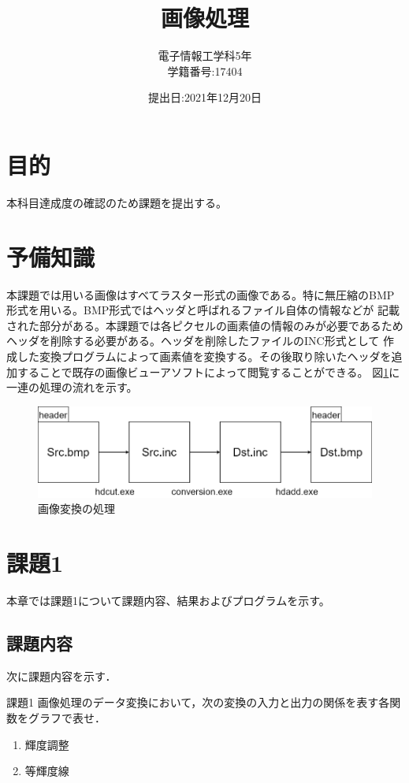 \documentclass[11pt,a4paper,titlepage,dvipdfmx]{jarticle}
\title{\huge{画像処理}}
\author{電子情報工学科5年 \\学籍番号:17404}
\date{提出日:2021年12月20日}
\begin{document}
  \maketitle

  \section{目的}
    本科目達成度の確認のため課題を提出する。
  \section{予備知識}
    本課題では用いる画像はすべてラスター形式の画像である。特に無圧縮のBMP形式を用いる。BMP形式ではヘッダと呼ばれるファイル自体の情報などが
    記載された部分がある。本課題では各ピクセルの画素値の情報のみが必要であるためヘッダを削除する必要がある。ヘッダを削除したファイルのINC形式として
    作成した変換プログラムによって画素値を変換する。その後取り除いたヘッダを追加することで既存の画像ビューアソフトによって閲覧することができる。
    図\ref{fig:flow}に一連の処理の流れを示す。
    \begin{figure}[H]
      \centering
      \includegraphics[scale=.4]{./flow.png}
      \caption{画像変換の処理}
      \label{fig:flow}
    \end{figure}
  \section{課題1}
    本章では課題1について課題内容、結果およびプログラムを示す。
    \subsection{課題内容}
      次に課題内容を示す．
      \begin{itembox}[l]{課題1}
        画像処理のデータ変換において，次の変換の入力と出力の関係を表す各関数をグラフで表せ．
        \begin{enumerate}
          \item 輝度調整
          \item 等輝度線
        \end{enumerate}
      \end{itembox}
\end{document}
